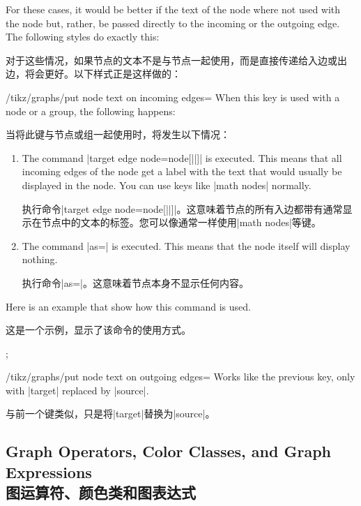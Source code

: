 For these cases, it would be better if the text of the node where not used with
the node but, rather, be passed directly to the incoming or the outgoing edge.
The following styles do exactly this:

对于这些情况，如果节点的文本不是与节点一起使用，而是直接传递给入边或出边，将会更好。以下样式正是这样做的：

\begin{key}{/tikz/graphs/put node text on incoming edges=}
    When this key is used with a node or a group, the following happens:
    
    当将此键与节点或组一起使用时，将发生以下情况：
%
    \begin{enumerate}
        \item The command
            |target edge node={node[||]{\tikzgraphnodetext}}| is
            executed. This means that all incoming edges of the node get a
            label with the text that would usually be displayed in the node.
            You can use keys like |math nodes| normally.

            执行命令|target edge node={node[||]{\tikzgraphnodetext}}|。这意味着节点的所有入边都带有通常显示在节点中的文本的标签。您可以像通常一样使用|math nodes|等键。
        \item The command |as={}| is executed. This means that the node itself
            will display nothing.

            执行命令|as={}|。这意味着节点本身不显示任何内容。
    \end{enumerate}
    Here is an example that show how this command is used.
    
    这是一个示例，显示了该命令的使用方式。
\begin{codeexample}[preamble={\usetikzlibrary{graphs}}]
\tikz {};
\end{codeexample}
\end{key}

\begin{key}{/tikz/graphs/put node text on outgoing edges=}
    Works like the previous key, only with |target| replaced by |source|.

    与前一个键类似，只是将|target|替换为|source|。
\end{key}


\subsection{Graph Operators, Color Classes, and Graph Expressions\\图运算符、颜色类和图表达式}
\label{section-library-graphs-color-classes}

